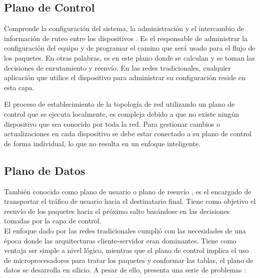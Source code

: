 \subsection{Plano de Control}
Comprende la configuración del sistema, la administración y el intercambio de información de ruteo entre los dispositivos \parencite{ControlPlane}. Es el responsable de administrar la configuración del equipo y de programar el camino que será usado para el flujo de los paquetes. En otras palabras, es en este plano donde se calculan y se toman las decisiones de enrutamiento y reenvío. En las redes tradicionales, cualquier aplicación que utilice el dispositivo para administrar su configuración reside en esta capa. 

El proceso de establecimiento de la topología de red utilizando un plano de control que se ejecuta localmente, es compleja debido a que no existe ningún dispositivo que sea conocido por toda la red. Para gestionar cambios o actualizaciones en cada dispositivo se debe estar conectado a su plano de control de forma individual, lo que no resulta en un enfoque inteligente.

\subsection{Plano de Datos}
También conocido como plano de usuario o plano de reenvío \parencite{DataPlane}, es el encargado de transportar el tráfico de usuario hacia el destinatario final. Tiene como objetivo el reenvío de los paquetes hacia el próximo salto basándose en las decisiones tomadas por la capa de control.
\\


El enfoque dado por las redes tradicionales cumplió con las necesidades de una época donde las arquitecturas cliente-servidor eran dominantes. Tiene como ventaja ser simple a nivel lógico, mientras que el plano de control implica el uso de microprocesadores para tratar los paquetes y conformar las tablas, el plano de datos se desarrolla en silicio. A pesar de ello, presenta una serie de problemas \parencite{onfwhitepaper}:

